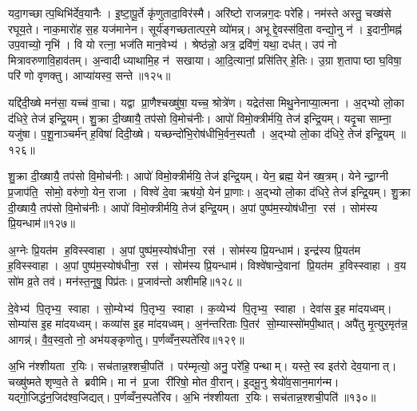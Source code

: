 यदा॒गच्छात्प॒थिभि॑र्देव॒यानैः। इ॒ष्टा॒पू॒र्ते कृ॑णुतादा॒विर॑स्मै। अरि॑ष्टो राजन्नग॒दः परे॑हि। नम॑स्ते अस्तु॒ चख्ष॑से रघूय॒ते। नाक॒मारो॑ह स॒ह यज॑मानेन। सूर्य॑ङ्गच्छतात्पर॒मे व्यो॑मन्न्। अभूद्दे॒वस्स॑वि॒ता वन्द्यो॒नु न॑। इ॒दानी॒मह्न॑ उप॒वाच्यो॒ नृभि॑। वि यो रत्ना॒ भज॑ति मान॒वेभ्य॑। श्रेष्ठ॑न्नो॒ अत्र॒ द्रवि॑णं॒ यथा॒ दध॑त्। उप॑ नो मित्रावरुणावि॒हाव॑तम्। अ॒न्वादीध्याथामि॒ह न॑ सखाया। आ॒दि॒त्यानां॒ प्रसि॑तिर् हे॒तिः। उ॒ग्रा श॒तापाष्ठा घ॒विषा॒ परि॑ णो वृणक्तु। आप्या॑यस्व॒ सन्ते॥१२५॥\anuvakamend[त्मना॒ जाय॑मानोऽस्य॒ दध॒त्पञ्च॑ च]

यद्दि॑दी॒ख्षे मन॑सा॒ यच्च॑ वा॒चा। यद्वा प्रा॒णैश्चख्षु॑षा॒ यच्च॒ श्रोत्रे॑ण। यद्रेत॑सा मिथु॒नेनाप्या॒त्मना। अ॒द्भ्यो लो॒का द॑धिरे॒ तेज॑ इन्द्रि॒यम्। शु॒क्रा दी॒ख्षायै॒ तप॑सो वि॒मोच॑नीः। आपो॑ विमो॒क्त्रीर्मयि॒ तेज॑ इन्द्रि॒यम्। यदृ॒चा साम्ना॒ यजु॑षा। प॒शू॒नाञ्चर्म॑न् ह॒विषा॑ दिदी॒ख्षे। यच्छन्दो॑भि॒रोष॑धीभि॒र्वन॒स्पतौ। अ॒द्भ्यो लो॒का द॑धिरे॒ तेज॑ इन्द्रि॒यम् ॥१२६॥

शु॒क्रा दी॒ख्षायै॒ तप॑सो वि॒मोच॑नीः। आपो॑ विमो॒क्त्रीर्मयि॒ तेज॑ इन्द्रि॒यम्। येन॒ ब्रह्म॒ येन॑ ख्ष॒त्रम्। येनेन्द्रा॒ग्नी प्र॒जाप॑ति॒ सोमो॒ वरु॑णो॒ येन॒ राजा। विश्वे॑ दे॒वा ऋष॑यो॒ येन॑ प्रा॒णाः। अ॒द्भ्यो लो॒का द॑धिरे॒ तेज॑ इन्द्रि॒यम्। शु॒क्रा दी॒ख्षायै॒ तप॑सो वि॒मोच॑नीः। आपो॑ विमो॒क्त्रीर्मयि॒ तेज॑ इन्द्रि॒यम्। अ॒पां पुष्प॑म॒स्योष॑धीना॒ रस॑। सोम॑स्य प्रि॒यन्धाम॑॥१२७॥

अ॒ग्नेः प्रि॒यत॑म ह॒विस्स्वाहा। अ॒पां पुष्प॑म॒स्योष॑धीना॒ रस॑। सोम॑स्य प्रि॒यन्धाम॑। इन्द्र॑स्य प्रि॒यत॑म ह॒विस्स्वाहा। अ॒पां पुष्प॑म॒स्योष॑धीना॒ रस॑। सोम॑स्य प्रि॒यन्धाम॑। विश्वे॑षान्दे॒वानां प्रि॒यत॑म ह॒विस्स्वाहा। व॒य सो॑म व्र॒ते तव॑। मन॑स्त॒नूषु॒ पिप्र॑तः। प्र॒जाव॑न्तो अशीमहि॥१२८॥

दे॒वेभ्य॑ पि॒तृभ्य॒ स्वाहा। सो॒म्येभ्य॑ पि॒तृभ्य॒ स्वाहा। क॒व्येभ्य॑ पि॒तृभ्य॒ स्वाहा। देवा॑स इ॒ह मा॑दयध्वम्। सोम्या॑स इ॒ह मा॑दयध्वम्। कव्या॑स इ॒ह मा॑दयध्वम्। अ॒न॑न्तरिताः पि॒तर॑ सो॒म्यास्सो॑मपी॒थात्। अपै॑तु मृ॒त्युर॒मृत॑न्न॒ आगन्न्॑। वै॒व॒स्व॒तो नो॒ अभ॑यङ्कृणोतु। प॒र्णव्वँन॒स्पते॑रिव॥१२९॥

अ॒भि न॑श्शीयता र॒यिः। सच॑तान्न॒श्शची॒पति॑। पर॑म्मृत्यो॒ अनु॒ परे॑हि॒ पन्थाम्। यस्ते॒ स्व इत॑रो देव॒यानात्। चख्षु॑ष्मते शृण्व॒ते ते ब्रवीमि। मा न॑ प्र॒जा री॑रिषो॒ मोत वी॒रान्। इ॒दमू॒नु श्रेयो॑व॒सान॒माग॑न्म। यद्गो॒जिद्ध॑न॒जिद॑श्व॒जिद्यत्। प॒र्णव्वँन॒स्पते॑रिव। अ॒भि न॑श्शीयता र॒यिः। सच॑तान्न॒श्शची॒पति॑॥१३०॥


